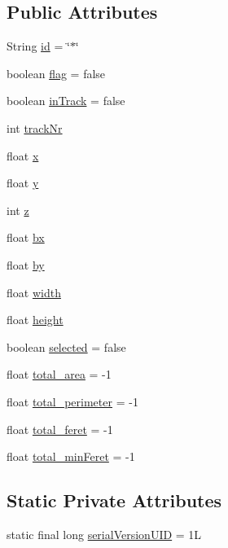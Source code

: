 \subsection*{Public Attributes}
\begin{DoxyCompactItemize}
\item 
String \hyperlink{classdata_1_1_spermatozoon_a76010eef1edc0406cc2375c25d2a433d}{id} = \char`\"{}$\ast$\char`\"{}
\item 
boolean \hyperlink{classdata_1_1_spermatozoon_ab46c49fb62e0ee61b3865f1e9153fdaa}{flag} = false
\item 
boolean \hyperlink{classdata_1_1_spermatozoon_a204be1963f7e7f07114c1d42360376be}{in\+Track} = false
\item 
int \hyperlink{classdata_1_1_spermatozoon_aee0b3af79335b49fe9d9b025cfcde703}{track\+Nr}
\item 
float \hyperlink{classdata_1_1_spermatozoon_ad0da36b2558901e21e7a30f6c227a45e}{x}
\item 
float \hyperlink{classdata_1_1_spermatozoon_aa4f0d3eebc3c443f9be81bf48561a217}{y}
\item 
int \hyperlink{classdata_1_1_spermatozoon_a14f94e529dff0b8bfba8e16fbe9755d6}{z}
\item 
float \hyperlink{classdata_1_1_spermatozoon_a5c25ae7634a79d11d6679b6b07c240a1}{bx}
\item 
float \hyperlink{classdata_1_1_spermatozoon_affce45e955f0a114a5569e019b8d8634}{by}
\item 
float \hyperlink{classdata_1_1_spermatozoon_ae426f00e82704fa09578f5446e22d915}{width}
\item 
float \hyperlink{classdata_1_1_spermatozoon_a48083b65ac9a863566dc3e3fff09a5b4}{height}
\item 
boolean \hyperlink{classdata_1_1_spermatozoon_a6c5a33868fa92607c84982d696b8e957}{selected} = false
\item 
float \hyperlink{classdata_1_1_spermatozoon_ac84d85b9355bdffd37cf8632c9f72efe}{total\+\_\+area} = -\/1
\item 
float \hyperlink{classdata_1_1_spermatozoon_a893cd9ee5a9bdc16eecb9891fadd602c}{total\+\_\+perimeter} = -\/1
\item 
float \hyperlink{classdata_1_1_spermatozoon_ab5ab64dc3696466f1e700d20d538e436}{total\+\_\+feret} = -\/1
\item 
float \hyperlink{classdata_1_1_spermatozoon_aea69b99de4cd3bda1fc7c464bb5d842e}{total\+\_\+min\+Feret} = -\/1
\end{DoxyCompactItemize}
\subsection*{Static Private Attributes}
\begin{DoxyCompactItemize}
\item 
static final long \hyperlink{classdata_1_1_spermatozoon_a3238d314ecdee14d2966760945d00c3b}{serial\+Version\+U\+ID} = 1L
\end{DoxyCompactItemize}


